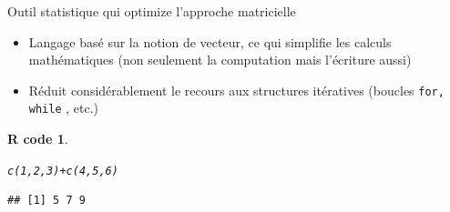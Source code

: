 \documentclass[11pt]{beamer}\usepackage[]{graphicx}\usepackage[]{color}
\makeatletter
\newcommand{\hlnum}[1]{\textcolor[rgb]{0.063,0.58,0.627}{#1}}%
\newcommand{\hlopt}[1]{\textcolor[rgb]{0.196,0.196,0.196}{#1}}%
\newcommand{\hlstd}[1]{\textcolor[rgb]{0.196,0.196,0.196}{#1}}%
\newcommand{\hlkwd}[1]{\textcolor[rgb]{0.78,0.227,0.412}{#1}}%
\newenvironment{kframe}{%
 \def\at@end@of@kframe{}%
 \ifinner\ifhmode%
  \def\at@end@of@kframe{\end{minipage}}%
  \begin{minipage}{\columnwidth}%
 \fi\fi%
 \def\FrameCommand##1{\hskip\@totalleftmargin \hskip-\fboxsep
 \colorbox{shadecolor}{##1}\hskip-\fboxsep
     \hskip-\linewidth \hskip-\@totalleftmargin \hskip\columnwidth}%
 \MakeFramed {\advance\hsize-\width
   \@totalleftmargin\z@ \linewidth\hsize
   \@setminipage}}%
 {\par\unskip\endMakeFramed%
 \at@end@of@kframe}
\newenvironment{knitrout}{}{} %
\newtheorem{rcode}{R code}[section]
\newcommand{\code}[1]{\texttt{#1}}
\makeatother
\begin{document}
\begin{frame}[fragile]{Outil statistique qui optimize l'approche matricielle}

\begin{itemize}
  \setlength\itemsep{2em}
\item Langage bas\'{e} sur la notion de vecteur, ce qui simplifie les calculs math\'{e}matiques (non seulement la computation mais l'écriture aussi)
\pause \item R\'{e}duit consid\'{e}rablement le recours aux structures it\'{e}ratives
(boucles \code{for, while} , etc.)
\end{itemize}
\pause 
\begin{knitrout}
\color{fgcolor}\begin{kframe}
\begin{rcode}\label{unnamed-chunk-1}\begin{alltt}
\hlkwd{c}\hlstd{(}\hlnum{1}\hlstd{,}\hlnum{2}\hlstd{,}\hlnum{3}\hlstd{)} \hlopt{+} \hlkwd{c}\hlstd{(}\hlnum{4}\hlstd{,}\hlnum{5}\hlstd{,}\hlnum{6}\hlstd{)}
\end{alltt}
\begin{verbatim}
## [1] 5 7 9
\end{verbatim}
\end{rcode}\end{kframe}
\end{knitrout}


\end{frame}
\end{document}
